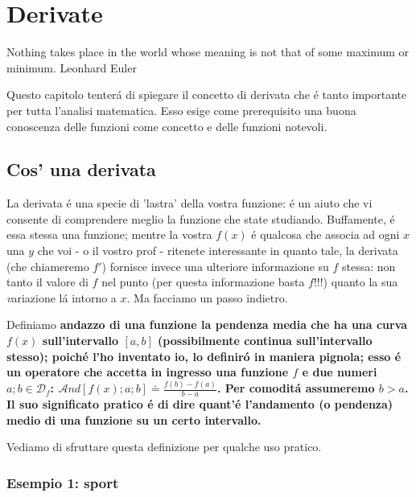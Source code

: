 \label{derivate}
\chapter{Derivate}

\citazioneinizioparagrafo
  {Nothing takes place in the world whose meaning is not that of some maximum or minimum.}
  {Leonhard Euler}

Questo capitolo tenter\'a di spiegare il concetto di derivata che \'e tanto importante per tutta l'analisi matematica.
Esso esige come prerequisito una buona conoscenza delle funzioni come concetto e delle funzioni notevoli.

\section{Cos' \egrave una derivata}

La derivata \'e una specie di 'lastra' della vostra funzione: \'e un aiuto che vi consente di comprendere meglio la
funzione che state studiando. Buffamente, \'e essa stessa una funzione; mentre la vostra $f(x)$ \'e qualcosa che associa
ad ogni $x$ una $y$ che voi - o il vostro prof - ritenete interessante in quanto tale, la derivata (che chiameremo $f'$)
fornisce invece una ulteriore informazione su $f$ stessa: non tanto il valore di $f$ nel punto (per questa informazione
basta $f$!!!) quanto la sua {\emph variazione} l\'a intorno a $x$. Ma facciamo un passo indietro.


\label{andazzo}
\begin{definizione}[Andazzo] Definiamo \bf{andazzo} di una funzione la pendenza media che ha una curva $f(x)$ sull'intervallo 
      $[a,b]$ (possibilmente continua sull'intervallo stesso); poich\'e l'ho inventato io, lo definir\'o in maniera pignola; esso
      \'e un operatore che accetta in ingresso una funzione $f$ e due numeri $a;b \in \mathcal{D}_f$: $\mathcal{A}nd[f(x);a;b] \doteq \frac{f(b)-f(a)}{b-a}$.
      Per comodit\'a assumeremo $b>a$. Il suo significato pratico \'e di dire quant'\'e
       l'andamento (o pendenza) medio di una funzione su un certo intervallo.
\end{definizione}

Vediamo di sfruttare questa definizione per qualche uso pratico. 

\subsection{Esempio 1: sport}

